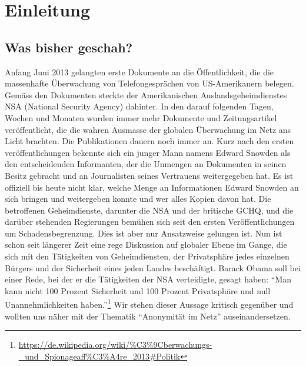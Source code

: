 \newpage
\section{Einleitung}

\subsection{Was bisher geschah?}
Anfang Juni 2013 gelangten erste Dokumente an die Öffentlichkeit, die die massenhafte Überwachung von Telefongesprächen von US-Amerikanern belegen. Gemäss den Dokumenten steckte der Amerikanischen Auslandsgeheimdienstes NSA (National Security Agency) dahinter. In den darauf folgenden Tagen, Wochen und Monaten wurden immer mehr Dokumente und Zeitungsartikel veröffentlicht, die die wahren Ausmasse der globalen Überwachung im Netz ans Licht brachten. Die Publikationen dauern noch immer an. Kurz nach den ersten veröffentlichungen bekennte sich ein junger Mann namens Edward Snowden als den entscheidenden Informanten, der die Unmengen an Dokumenten in seinen Besitz gebracht und an Journalisten seines Vertrauens weitergegeben hat. Es ist offiziell bis heute nicht klar, welche Menge an Informationen Edward Snowden an sich bringen und weitergeben konnte und wer alles Kopien davon hat. Die betroffenen Geheimdienste, darunter die NSA und der britische GCHQ, und die darüber stehenden Regierungen bemühen sich seit den ersten Veröffentlichungen um Schadensbegrenzung. Dies ist aber nur Ansatzweise gelungen ist. Nun ist schon seit längerer Zeit eine rege Diskussion auf globaler Ebene im Gange, die sich mit den Tätigkeiten von Geheimdiensten, der Privatsphäre jedes einzelnen Bürgers und der Sicherheit eines jeden Landes beschäftigt. Barack Obama soll bei einer Rede, bei der er die Tätigkeiten der NSA verteidigte, gesagt haben: ``Man kann nicht 100 Prozent Sicherheit und 100 Prozent Privatsphäre und null Unannehmlichkeiten haben.''\footnote{\url{https://de.wikipedia.org/wiki/\%C3\%9Cberwachungs-_und_Spionageaff\%C3\%A4re_2013\#Politik}}
Wir stehen dieser Aussage kritisch gegenüber und wollten uns näher mit der Thematik ``Anonymität im Netz'' auseinandersetzen.

